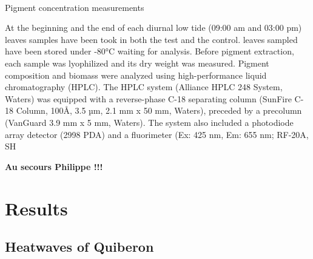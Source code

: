 \documentclass[
  number]{elsarticle}
\makeatletter
\let\oldparagraph\paragraph
\renewcommand{\paragraph}{
    \@ifstar
      \xxxParagraphStar
      \xxxParagraphNoStar
  }
\newcommand{\xxxParagraphStar}[1]{\oldparagraph*{#1}\mbox{}}
\newcommand{\xxxParagraphNoStar}[1]{\oldparagraph{#1}\mbox{}}
\makeatother
\begin{document}
\paragraph{Pigment concentration
measurements}\label{pigment-concentration-measurements}

At the beginning and the end of each diurnal low tide (09:00 am and
03:00 pm) leaves samples have been took in both the test and the
control. leaves sampled have been stored under -80°C waiting for
analysis. Before pigment extraction, each sample was lyophilized and its
dry weight was measured. Pigment composition and biomass were analyzed
using high-performance liquid chromatography (HPLC). The HPLC system
(Alliance HPLC 248 System, Waters) was equipped with a reverse-phase
C-18 separating column (SunFire C-18 Column, 100Å, 3.5 µm, 2.1 mm x 50
mm, Waters), preceded by a precolumn (VanGuard 3.9 mm x 5 mm, Waters).
The system also included a photodiode array detector (2998 PDA) and a
fluorimeter (Ex: 425 nm, Em: 655 nm; RF-20A, SH

\textbf{Au secours Philippe !!!}

\section{Results}\label{results}

\subsection{Heatwaves of Quiberon}\label{heatwaves-of-quiberon}
\end{document}
